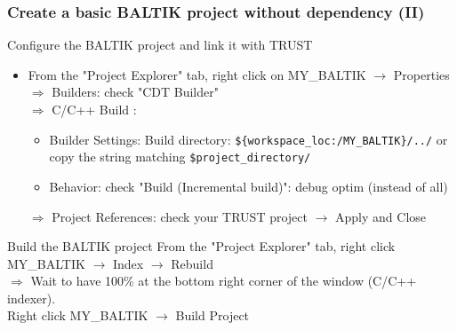 \documentclass[10pt, hyperref={unicode=true,pdfusetitle, bookmarks=true,bookmarksnumbered=false,bookmarksopen=false, breaklinks=false,pdfborder={0 0 1},backref=true,colorlinks=true,linkcolor=darkblue,pageanchor, urlcolor=darkblue}]{beamer}
\begin{document}
\begin{frame}
\frametitle{Create a basic BALTIK project without dependency (II)}

\begin{exampleblock}{Configure the BALTIK project and link it with TRUST}
\begin{itemize}
\item From the "Project Explorer" tab, right click on MY\_BALTIK $\rightarrow$ Properties \\
  $\Rightarrow$ Builders: check "CDT Builder" \\
  $\Rightarrow$ C/C++ Build : 
  \begin{itemize}
  \item Builder Settings: Build directory: \texttt{\$\{workspace\_loc:/MY\_BALTIK\}/../} or copy the string matching \texttt{\$project\_directory/} \\
  \item Behavior: check "Build (Incremental build)": debug optim (instead of all) 
  \end{itemize}
  $\Rightarrow$ Project References: check your TRUST project $\rightarrow$ Apply and Close
\end{itemize}
\end{exampleblock}
  
\begin{exampleblock}{Build the BALTIK project}
From the "Project Explorer" tab, right click MY\_BALTIK $\rightarrow$ Index $\rightarrow$ Rebuild \\
  $\Rightarrow$ Wait to have 100\% at the bottom right corner of the window  (C/C++ indexer). \\
  Right click MY\_BALTIK $\rightarrow$ Build Project \\
\end{exampleblock}

\end{frame}
\end{document}
